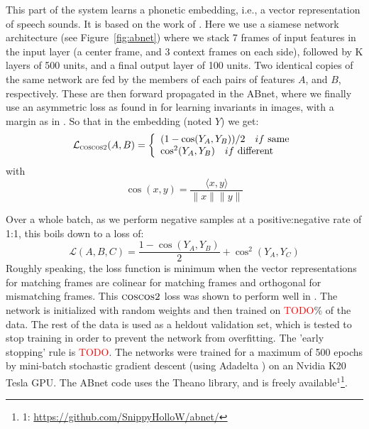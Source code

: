 \documentclass[a4paper]{article}
\begin{document}
This part of the system learns a phonetic embedding, i.e., a vector representation of speech sounds. It is based on the work of \cite{synnaeve&dupoux2014}. Here we use a siamese network architecture \cite{siamese} (see Figure~\ref{fig:abnet}) where we stack 7 frames of input features in the input layer (a center frame, and 3 context frames on each side), followed by K layers of 500 units, and a final output layer of 100 units. Two identical copies of the same network are fed by the members of each pairs of features $A$, and $B$, respectively. %
These are then forward propagated in the ABnet, where we finally use an asymmetric loss as found in \cite{drlim} for learning invariants in images, with a margin as in \cite{wsabie}. So that in the embedding (noted $Y$) we get:
\begin{eqnarray*}
    \mathcal{L}_{\textsc{coscos2}}(A,B) = \left\{
        \begin{array}{l}
              (1-\cos(Y_A, Y_B)) / 2 \ \ \ if\ \mathrm{same}\\
                \cos^2(Y_A, Y_B)\ \ \ if\ \mathrm{different}
            \end{array}\right.
        \end{eqnarray*}
        with $$\cos(x, y) = \frac{\langle x, y \rangle}{\|x\|\|y\|}$$


Over a whole batch, as we perform negative samples at a positive:negative rate of 1:1, this boils down to a loss of:
$$\mathcal{L}(A,B,C) = \frac{1 - \cos(Y_A, Y_B)}{2} + \cos^2(Y_A, Y_{C})$$
Roughly speaking, the loss function is minimum when the vector representations for matching frames are colinear for matching frames and orthogonal for mismatching frames. This $\textsc{coscos2}$ loss was shown to perform well in \cite{synnaeve}. The network is initialized with random weights and then trained on \textcolor{red}{TODO}\% of the data. The rest of the data is used as a heldout validation set, which is tested to stop training in order to prevent the network from overfitting. The  'early stopping' rule is \textcolor{red}{TODO}. The networks were trained for a maximum of 500 epochs by mini-batch stochastic gradient descent (using Adadelta \cite{adadelta}) on an Nvidia K20 Tesla GPU. The ABnet code uses the Theano library\cite{theano2010,theano2012}, and is freely available$^1$\footnote{1: \url{https://github.com/SnippyHolloW/abnet/}}.
\end{document}
